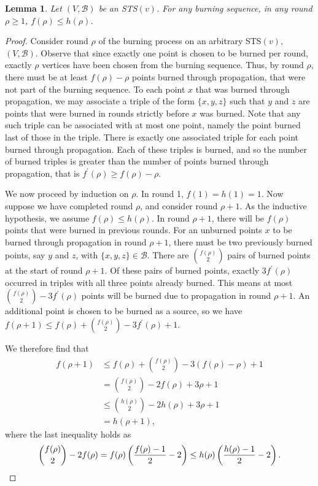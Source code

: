 \documentclass[12pt]{article}
\newtheorem{lemma}[theorem]{Lemma}
\theoremstyle{definition}
\numberwithin{table}{section}
\newcommand{\round}{{\rho}}
\begin{document}
\begin{lemma}
\label{big_lem}
Let $(V,\mathcal{B})$ be an STS$(v)$. For any burning sequence, in any round $\round \geq 1$, $f(\round) \leq h(\round)$. 
\end{lemma}

\begin{proof}
Consider round $\round$ of the burning process on an arbitrary STS$(v)$, $(V,\mathcal{B})$.
Observe that since exactly one point is chosen to be burned per round, exactly $\round$ vertices have been chosen from the burning sequence. Thus, by round $\round$, there must be at least $f(\round) - \round$ points burned through propagation, that were not part of the burning sequence.  
To each point $x$ that was burned through propagation, we may associate a triple of the form $\{x,y,z\}$ such that $y$ and $z$ are points that were burned in rounds strictly before $x$ was burned. 
Note that any such triple can be associated with at most one point, namely the point burned last of those in the triple. 
There is exactly one associated triple for each point burned through propagation. Each of these triples is burned, and so the number of burned triples is greater than the number of points burned through propagation, that is
$f^\prime(\round)\geq f(\round) - \round$. 

We now proceed by induction on $\round$.
In round 1, $f(1)=h(1)=1$.
Now suppose we have completed round $\round$, and consider round $\round+1$.  As the inductive hypothesis, we assume $f(\round) \leq h(\round)$. 
In round $\round+1$, there will be $f(\round)$ points that were burned in previous rounds. 
For an unburned points $x$ to be burned through propagation in round $\round+1$, there must be two previously burned points, say $y$ and $z$, with $\{x,y,z\} \in \mathcal{B}$. 
There are $\binom{f(\round)}{2}$ pairs of burned points at the start of round $\round+1$. 
Of these pairs of burned points, exactly $3f^\prime(\round)$ occurred in triples with all three points already burned. 
This means at most $\binom{f(\round)}{2}-3f^\prime(\round)$ points will be burned due to propagation in round $\round+1$. 
An additional point is chosen to be burned as a source, so we have $f(\round+1) \leq f(\round) + \binom{f(\round)}{2}-3f^\prime(\round)+1$. 

We therefore find that 
\begin{align*}
    f(\round+1) &\leq f(\round) + \binom{f(\round)}{2}-3(f(\round) - \round) +1\\
            &= \binom{f(\round)}{2}-2f(\round) +3\round+1\\
            & \leq \binom{h(\round)}{2}-2h(\round) +3\round+1 \\
            & = h(\round+1),
\end{align*}
where the last inequality holds as 
\[
\binom{f(\round)}{2}-2f(\round) = f(\round)\left( \frac{f(\round)-1}{2} -2 \right) \leq h(\round)\left( \frac{h(\round)-1}{2} -2 \right). \qedhere
\]
\end{proof}
\end{document}
